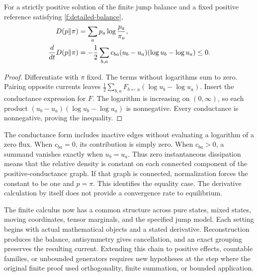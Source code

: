 \begin{theorem}\label{f:relative-entropy}
For a strictly positive solution of the finite jump balance and a fixed positive reference satisfying \eqref{f:detailed-balance},
\begin{align}\label{f:dissipation}
 D(p\Vert\pi)&=\sum_ap_a\log\frac{p_a}{\pi_a},\\
 \frac{d}{dt}D(p\Vert\pi)
 &=-\frac12\sum_{b,a}c_{ba}(u_b-u_a)(\log u_b-\log u_a)\le0.
 \notag
\end{align}
\end{theorem}

\begin{proof}
Differentiate with $\pi$ fixed. The terms without logarithms sum to zero. Pairing opposite currents leaves
$\tfrac12\sum_{b,a}F_{b\leftarrow a}(\log u_b-\log u_a)$.
Insert the conductance expression for $F$. The logarithm is increasing on $(0,\infty)$, so each product
$(u_b-u_a)(\log u_b-\log u_a)$ is nonnegative. Every conductance is nonnegative, proving the inequality.
\end{proof}

The conductance form includes inactive edges without evaluating a logarithm of a zero flux. When $c_{ba}=0$, its contribution is simply zero. When $c_{ba}>0$, a summand vanishes exactly when $u_b=u_a$. Thus zero instantaneous dissipation means that the relative density is constant on each connected component of the positive-conductance graph. If that graph is connected, normalization forces the constant to be one and $p=\pi$. This identifies the equality case. The derivative calculation by itself does not provide a convergence rate to equilibrium.



The finite calculus now has a common structure across pure states, mixed states, moving coordinates, tensor marginals, and the specified jump model. Each setting begins with actual mathematical objects and a stated derivative. Reconstruction produces the balance, antisymmetry gives cancellation, and an exact grouping preserves the resulting current. Extending this chain to positive effects, countable families, or unbounded generators requires new hypotheses at the step where the original finite proof used orthogonality, finite summation, or bounded application.
